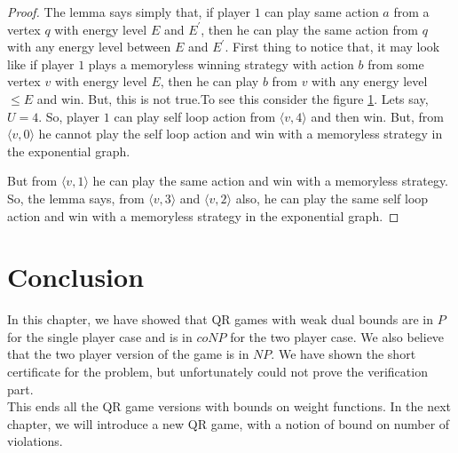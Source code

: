 \begin{proof}
The lemma says simply that, if player $1$ can play same action $a$ from a vertex $q$ with energy level $E$ and $E^{\prime}$, then he can play the same action from $q$ with any energy level between $E$ and $E^{\prime}$. First thing to notice that, it may look like if player $1$ plays a memoryless winning strategy with action $b$ from some vertex $v$ with energy level $E$, then he can play $b$ from $v$ with any energy level $\leq E$ and win. But, this is not true.To see this consider the figure \ref{not_true}. Lets say, $U=4$. So, player $1$ can play self loop action from $\langle v,4 \rangle$ and then win. But, from $\langle v,0 \rangle$ he cannot play the self loop action and win with a memoryless strategy in the exponential graph.\\
\begin{figure}[htb]
\hskip 6cm
\label{not_true}

\end{figure}
But from $\langle v,1 \rangle$ he can play the same action and win with a memoryless strategy. So, the lemma says, from $\langle v,3 \rangle$ and $\langle v,2 \rangle$ also, he can play the same self loop action and win with a memoryless strategy in the exponential graph.
\end{proof}
\vskip 0.5cm
\section{Conclusion}
In this chapter, we have showed that QR games with weak dual bounds are in $P$ for the single player case and is in $coNP$ for the two player case. We also believe that the two player version of the game is in $NP$. We have shown the short certificate for the problem, but unfortunately could not prove the verification part.\\
This ends all the QR game versions with bounds on weight functions. In the next chapter, we will introduce a new QR game, with a notion of bound on number of violations.